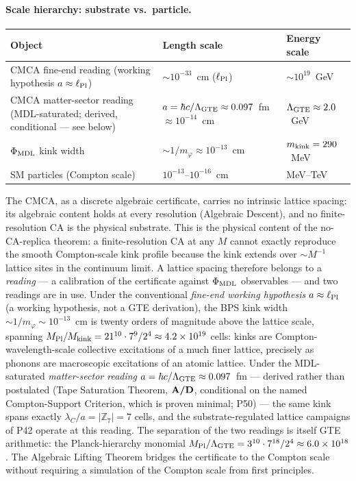 \paragraph{Scale hierarchy: substrate vs.\ particle.}
\begin{center}
\small
\begin{tabular}{@{}p{4.5cm}p{5.5cm}p{4.0cm}@{}}
\toprule
\textbf{Object} & \textbf{Length scale} & \textbf{Energy scale} \\
\midrule
CMCA fine-end reading (working hypothesis $a \approx \ell_{\rm Pl}$) & ${\sim}10^{-33}$~cm ($\ell_{\rm Pl}$) & ${\sim}10^{19}$~GeV \\
CMCA matter-sector reading (MDL-saturated; derived, conditional --- see below) & $a = \hbar c/\Lambda_{\rm GTE} \approx 0.097$~fm $\approx 10^{-14}$~cm & $\Lambda_{\rm GTE} \approx 2.0$~GeV \\
$\Phi_{\rm MDL}$ kink width & ${\sim}1/m_\varphi \approx 10^{-13}$~cm & $m_{\rm kink} = 290$~MeV \\
SM particles (Compton scale) & $10^{-13}$--$10^{-16}$~cm & MeV--TeV \\
\bottomrule
\end{tabular}
\end{center}
The CMCA, as a discrete algebraic certificate, carries no intrinsic lattice spacing: its algebraic content holds at every resolution (Algebraic Descent), and no finite-resolution CA is the physical substrate.  This is the physical content of the no-CA-replica theorem: a finite-resolution CA at any $M$ cannot exactly reproduce the smooth Compton-scale kink profile because the kink extends over $\sim M^{-1}$ lattice sites in the continuum limit.  A lattice spacing therefore belongs to a \emph{reading} --- a calibration of the certificate against $\Phi_{\rm MDL}$ observables --- and two readings are in use.  Under the conventional \emph{fine-end working hypothesis} $a \approx \ell_{\rm Pl}$ (a working hypothesis, not a GTE derivation), the BPS kink width $\sim 1/m_\varphi \sim 10^{-13}$~cm is twenty orders of magnitude above the lattice scale, spanning $M_{\rm Pl}/M_{\rm kink} = 21^{10}\cdot 7^{9}/2^{4} \approx 4.2\times10^{19}$ cells: kinks are Compton-wavelength-scale collective excitations of a much finer lattice, precisely as phonons are macroscopic excitations of an atomic lattice.  Under the MDL-saturated \emph{matter-sector reading} $a = \hbar c/\Lambda_{\rm GTE} \approx 0.097$~fm --- derived rather than postulated (Tape Saturation Theorem, $\textbf{A/D}$, conditional on the named Compton-Support Criterion, which is proven minimal; P50) --- the same kink spans exactly $\lambda_C/a = |\mathbb{Z}_7| = 7$ cells, and the substrate-regulated lattice campaigns of P42 operate at this reading.  The separation of the two readings is itself GTE arithmetic: the Planck-hierarchy monomial $M_{\rm Pl}/\Lambda_{\rm GTE} = 3^{10}\cdot 7^{18}/2^{4} \approx 6.0\times10^{18}$.  The Algebraic Lifting Theorem bridges the certificate to the Compton scale without requiring a simulation of the Compton scale from first principles.

